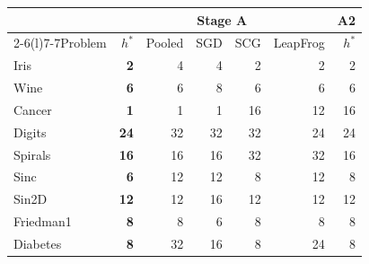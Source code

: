 \begin{tabular}{@{}lrrrrrr@{}}
\toprule
& \multicolumn{5}{c}{Stage A} & A2 \\ \cmidrule(lr){2-6}\cmidrule(l){7-7}Problem & $h^*$ & Pooled & SGD & SCG & LeapFrog & $h^*$ \\
\midrule
Iris & \textbf{2} & 4 & 4 & 2 & 2 & 2 \\
Wine & \textbf{6} & 6 & 8 & 6 & 6 & 6 \\
Cancer & \textbf{1} & 1 & 1 & 16 & 12 & 16 \\
Digits & \textbf{24} & 32 & 32 & 32 & 24 & 24 \\
Spirals & \textbf{16} & 16 & 16 & 32 & 32 & 16 \\
Sinc & \textbf{6} & 12 & 12 & 8 & 12 & 8 \\
Sin2D & \textbf{12} & 12 & 16 & 12 & 12 & 12 \\
Friedman1 & \textbf{8} & 8 & 6 & 8 & 8 & 8 \\
Diabetes & \textbf{8} & 32 & 16 & 8 & 24 & 8 \\
\bottomrule
\end{tabular}
